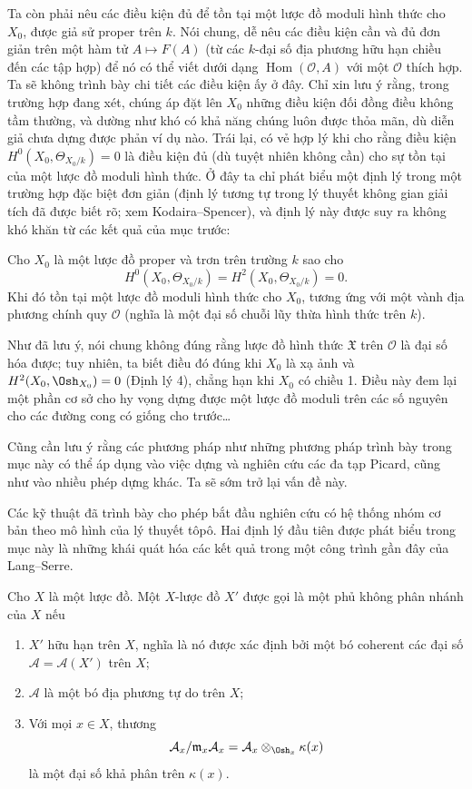 Ta còn phải nêu các điều kiện đủ để tồn tại một lược đồ moduli hình thức cho
$X_0$, được giả sử proper trên $k$. Nói chung, dễ nêu các điều kiện cần và đủ
đơn giản trên một hàm tử $A\longmapsto F(A)$ (từ các $k$-đại số địa phương
hữu hạn chiều đến các tập hợp) để nó có thể viết dưới dạng
$\operatorname{Hom}(\mathcal O,A)$ với một $\mathcal O$ thích hợp. Ta sẽ
không trình bày chi tiết các điều kiện ấy ở đây. Chỉ xin lưu ý rằng, trong
trường hợp đang xét, chúng áp đặt lên $X_0$ những điều kiện đối đồng điều không
tầm thường, và dường như khó có khả năng chúng luôn được thỏa mãn, dù diễn giả
chưa dựng được phản ví dụ nào. Trái lại, có vẻ hợp lý khi cho rằng điều kiện
$H^0(X_0,\Theta_{X_0/k})=0$ là điều kiện đủ (dù tuyệt nhiên không cần) cho sự
tồn tại của một lược đồ moduli hình thức. Ở đây ta chỉ phát biểu một định lý
trong một trường hợp đặc biệt đơn giản (định lý tương tự trong lý thuyết không
gian giải tích đã được biết rõ; xem Kodaira--Spencer), và định lý này được suy
ra không khó khăn từ các kết quả của mục trước:

 Cho $X_0$ là một lược đồ proper và trơn trên trường $k$
sao cho
\[
  H^0(X_0,\Theta_{X_0/k})=H^2(X_0,\Theta_{X_0/k})=0.
\]
Khi đó tồn tại một lược đồ moduli hình thức cho $X_0$, tương ứng với một vành
địa phương chính quy $\mathcal O$ (nghĩa là một đại số chuỗi lũy thừa hình thức
trên $k$).

Như đã lưu ý, nói chung không đúng rằng lược đồ hình thức $\mathfrak X$ trên
$\mathcal O$ là đại số hóa được; tuy nhiên, ta biết điều đó đúng khi $X_0$ là
xạ ảnh và $H^2(X_0,\Osh_{X_0})=0$ (Định lý 4), chẳng hạn khi $X_0$ có chiều
1. Điều này đem lại một phần cơ sở cho hy vọng dựng được một lược đồ moduli
trên các số nguyên cho các đường cong có giống cho trước\ldots{}

Cũng cần lưu ý rằng các phương pháp như những phương pháp trình bày trong mục
này có thể áp dụng vào việc dựng và nghiên cứu các đa tạp Picard, cũng như vào
nhiều phép dựng khác. Ta sẽ sớm trở lại vấn đề này.


Các kỹ thuật đã trình bày cho phép bắt đầu nghiên cứu có hệ thống nhóm cơ bản
theo mô hình của lý thuyết tôpô. Hai định lý đầu tiên được phát biểu trong mục
này là những khái quát hóa các kết quả trong một công trình gần đây của
Lang--Serre.

Cho $X$ là một lược đồ. Một $X$-lược đồ $X'$ được gọi là một phủ không phân
nhánh của $X$ nếu
\begin{enumerate}
  \item[\textit{i.}] $X'$ hữu hạn trên $X$, nghĩa là nó được xác định bởi một
    bó coherent các đại số $\mathcal A=\mathcal A(X')$ trên $X$;
  \item[\textit{ii.}] $\mathcal A$ là một bó địa phương tự do trên $X$;
  \item[\textit{iii.}] Với mọi $x\in X$, thương
    \[
      \mathcal A_x/\mathfrak m_x\mathcal A_x
      =\mathcal A_x\otimes_{\Osh_x}\kappa(x)
    \]
    là một đại số khả phân trên $\kappa(x)$.
\end{enumerate}

